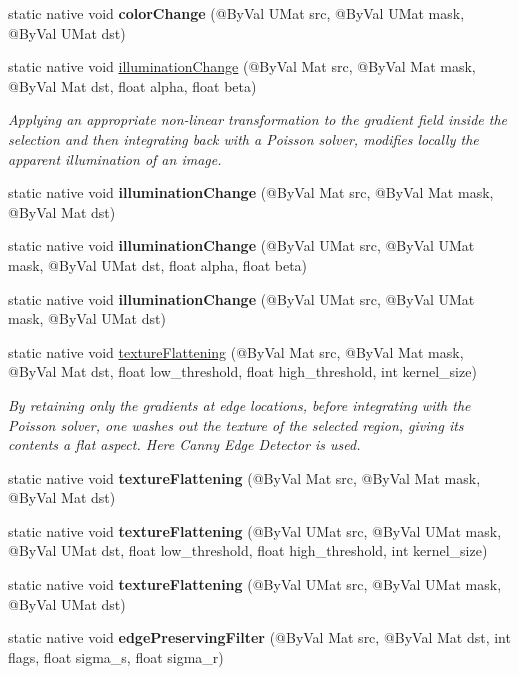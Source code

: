 \begin{DoxyCompactItemize}
static native void {\bfseries color\+Change} (@By\+Val U\+Mat src, @By\+Val U\+Mat mask, @By\+Val U\+Mat dst)
\item 
static native void \hyperlink{group__photo__clone_gab7df287c3db8bb77269a05cb1e758591}{illumination\+Change} (@By\+Val Mat src, @By\+Val Mat mask, @By\+Val Mat dst, float alpha, float beta)
\begin{DoxyCompactList}\small\item\em Applying an appropriate non-\/linear transformation to the gradient field inside the selection and then integrating back with a Poisson solver, modifies locally the apparent illumination of an image. \end{DoxyCompactList}\item 
static native void {\bfseries illumination\+Change} (@By\+Val Mat src, @By\+Val Mat mask, @By\+Val Mat dst)
\item 
static native void {\bfseries illumination\+Change} (@By\+Val U\+Mat src, @By\+Val U\+Mat mask, @By\+Val U\+Mat dst, float alpha, float beta)
\item 
static native void {\bfseries illumination\+Change} (@By\+Val U\+Mat src, @By\+Val U\+Mat mask, @By\+Val U\+Mat dst)
\item 
static native void \hyperlink{group__photo__clone_ga8d42433222e7742e59e275e148c3d4a5}{texture\+Flattening} (@By\+Val Mat src, @By\+Val Mat mask, @By\+Val Mat dst, float low\+\_\+threshold, float high\+\_\+threshold, int kernel\+\_\+size)
\begin{DoxyCompactList}\small\item\em By retaining only the gradients at edge locations, before integrating with the Poisson solver, one washes out the texture of the selected region, giving its contents a flat aspect. Here Canny Edge Detector is used. \end{DoxyCompactList}\item 
static native void {\bfseries texture\+Flattening} (@By\+Val Mat src, @By\+Val Mat mask, @By\+Val Mat dst)
\item 
static native void {\bfseries texture\+Flattening} (@By\+Val U\+Mat src, @By\+Val U\+Mat mask, @By\+Val U\+Mat dst, float low\+\_\+threshold, float high\+\_\+threshold, int kernel\+\_\+size)
\item 
static native void {\bfseries texture\+Flattening} (@By\+Val U\+Mat src, @By\+Val U\+Mat mask, @By\+Val U\+Mat dst)
\item 
static native void {\bfseries edge\+Preserving\+Filter} (@By\+Val Mat src, @By\+Val Mat dst, int flags, float sigma\+\_\+s, float sigma\+\_\+r)

\end{DoxyCompactItemize}
